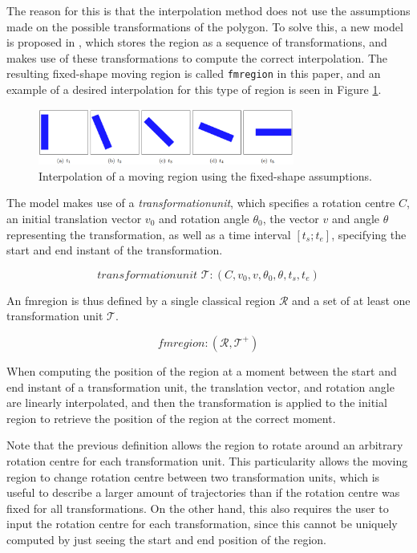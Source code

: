 The reason for this is that the interpolation method does not use the assumptions made on the possible transformations of the polygon. To solve this, a new model is proposed in \cite{fmregion}, which stores the region as a sequence of transformations, and makes use of these transformations to compute the correct interpolation. The resulting fixed-shape moving region is called \lstinline{fmregion} in this paper, and an example of a desired interpolation for this type of region is seen in Figure \ref{fig:fixed_shape_interpolation}.

\begin{figure}[h!]
    \centering
    \includegraphics[width=0.75\textwidth]{images/fixed_shape_interpolation.png}
    \caption[Linear interpolation of a fixed-shape moving region]{Interpolation of a moving region using the fixed-shape assumptions. \cite{fmregion}}
    \label{fig:fixed_shape_interpolation}
\end{figure}


The model makes use of a \textit{transformationunit}, which specifies a rotation centre $C$, an initial translation vector $v_0$ and rotation angle $\theta_0$, the vector $v$ and angle $\theta$ representing the transformation, as well as a time interval $[t_s; t_e]$, specifying the start and end instant of the transformation.

\[
    \textit{transformationunit } \mathcal{T}: (C, v_0, v, \theta_0, \theta, t_{s}, t_{e})
\]

An fmregion is thus defined by a single classical region $\mathcal{R}$ and a set of at least one transformation unit $\mathcal{T}$.

\[
    \textit{fmregion} : (\mathcal{R}, \mathcal{T}^{+})
\]

When computing the position of the region at a moment between the start and end instant of a transformation unit, the translation vector, and rotation angle are linearly interpolated, and then the transformation is applied to the initial region to retrieve the position of the region at the correct moment.

Note that the previous definition allows the region to rotate around an arbitrary rotation centre for each transformation unit. This particularity allows the moving region to change rotation centre between two transformation units, which is useful to describe a larger amount of trajectories than if the rotation centre was fixed for all transformations. On the other hand, this also requires the user to input the rotation centre for each transformation, since this cannot be uniquely computed by just seeing the start and end position of the region.


